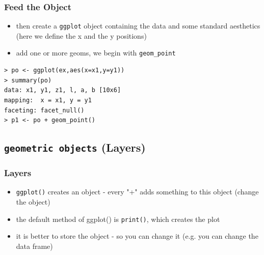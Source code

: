\documentclass[xcolor={table},c]{beamer}
\begin{document}
\begin{frame}[fragile]\frametitle{Feed the Object}
  \begin{itemize}
  \item then create a \texttt{ggplot} object containing the data and some standard aesthetics (here we define the x and the y positions)
   \item add one or more geoms, we begin with  \texttt{geom\_point}
  \end{itemize}
\begin{verbatim}
> po <- ggplot(ex,aes(x=x1,y=y1))
> summary(po)
data: x1, y1, z1, l, a, b [10x6]
mapping:  x = x1, y = y1
faceting: facet_null() 
> p1 <- po + geom_point()
\end{verbatim}
\begin{center}
\end{center}
\end{frame}

\subsection{\texttt{geometric objects} (Layers)}

\begin{frame}\frametitle{Layers}
  \begin{itemize}
    \item \texttt{ggplot()} creates an object - every "+" adds something to this object (change the object)
    \item the default method of ggplot() is \texttt{print()}, which creates the plot
    \item it is better to store the object - so you can change it (e.g. you can change the data frame)
  \end{itemize}
\end{frame}
\end{document}
